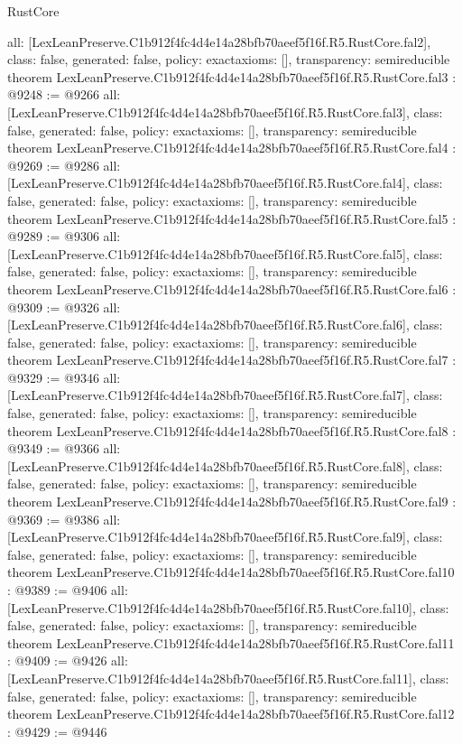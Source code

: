 \begin{lexlean}{RustCore}
\begin{coremodule}
{  all: [LexLeanPreserve.C1b912f4fc4d4e14a28bfb70aeef5f16f.R5.RustCore.fal2],
  class: false,
  generated: false,
  policy: exact{axioms: []},
  transparency: semireducible
}
theorem LexLeanPreserve.C1b912f4fc4d4e14a28bfb70aeef5f16f.R5.RustCore.fal3 : @9248 := @9266 {
  all: [LexLeanPreserve.C1b912f4fc4d4e14a28bfb70aeef5f16f.R5.RustCore.fal3],
  class: false,
  generated: false,
  policy: exact{axioms: []},
  transparency: semireducible
}
theorem LexLeanPreserve.C1b912f4fc4d4e14a28bfb70aeef5f16f.R5.RustCore.fal4 : @9269 := @9286 {
  all: [LexLeanPreserve.C1b912f4fc4d4e14a28bfb70aeef5f16f.R5.RustCore.fal4],
  class: false,
  generated: false,
  policy: exact{axioms: []},
  transparency: semireducible
}
theorem LexLeanPreserve.C1b912f4fc4d4e14a28bfb70aeef5f16f.R5.RustCore.fal5 : @9289 := @9306 {
  all: [LexLeanPreserve.C1b912f4fc4d4e14a28bfb70aeef5f16f.R5.RustCore.fal5],
  class: false,
  generated: false,
  policy: exact{axioms: []},
  transparency: semireducible
}
theorem LexLeanPreserve.C1b912f4fc4d4e14a28bfb70aeef5f16f.R5.RustCore.fal6 : @9309 := @9326 {
  all: [LexLeanPreserve.C1b912f4fc4d4e14a28bfb70aeef5f16f.R5.RustCore.fal6],
  class: false,
  generated: false,
  policy: exact{axioms: []},
  transparency: semireducible
}
theorem LexLeanPreserve.C1b912f4fc4d4e14a28bfb70aeef5f16f.R5.RustCore.fal7 : @9329 := @9346 {
  all: [LexLeanPreserve.C1b912f4fc4d4e14a28bfb70aeef5f16f.R5.RustCore.fal7],
  class: false,
  generated: false,
  policy: exact{axioms: []},
  transparency: semireducible
}
theorem LexLeanPreserve.C1b912f4fc4d4e14a28bfb70aeef5f16f.R5.RustCore.fal8 : @9349 := @9366 {
  all: [LexLeanPreserve.C1b912f4fc4d4e14a28bfb70aeef5f16f.R5.RustCore.fal8],
  class: false,
  generated: false,
  policy: exact{axioms: []},
  transparency: semireducible
}
theorem LexLeanPreserve.C1b912f4fc4d4e14a28bfb70aeef5f16f.R5.RustCore.fal9 : @9369 := @9386 {
  all: [LexLeanPreserve.C1b912f4fc4d4e14a28bfb70aeef5f16f.R5.RustCore.fal9],
  class: false,
  generated: false,
  policy: exact{axioms: []},
  transparency: semireducible
}
theorem LexLeanPreserve.C1b912f4fc4d4e14a28bfb70aeef5f16f.R5.RustCore.fal10 : @9389 := @9406 {
  all: [LexLeanPreserve.C1b912f4fc4d4e14a28bfb70aeef5f16f.R5.RustCore.fal10],
  class: false,
  generated: false,
  policy: exact{axioms: []},
  transparency: semireducible
}
theorem LexLeanPreserve.C1b912f4fc4d4e14a28bfb70aeef5f16f.R5.RustCore.fal11 : @9409 := @9426 {
  all: [LexLeanPreserve.C1b912f4fc4d4e14a28bfb70aeef5f16f.R5.RustCore.fal11],
  class: false,
  generated: false,
  policy: exact{axioms: []},
  transparency: semireducible
}
theorem LexLeanPreserve.C1b912f4fc4d4e14a28bfb70aeef5f16f.R5.RustCore.fal12 : @9429 := @9446 {
}
\end{coremodule}
\end{lexlean}
